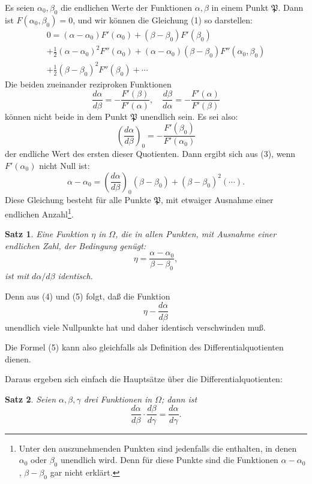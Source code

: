 \documentclass[12pt,a4paper]{article}
\newtheorem*{satz}{Satz}
\begin{document}
Es seien $\alpha_0, \beta_0$ die endlichen Werte der Funktionen $\alpha, \beta$ in einem Punkt $\mathfrak{P}$. Dann ist $F(\alpha_0, \beta_0) = 0$, und wir können die Gleichung (1) so darstellen:
\begin{multline}\label{eq:194-3}
0 = (\alpha - \alpha_0) F'(\alpha_0) + (\beta - \beta_0) F'(\beta_0) \\
+ \tfrac{1}{2}(\alpha - \alpha_0)^2 F''(\alpha_0) + (\alpha - \alpha_0)(\beta - \beta_0) F''(\alpha_0, \beta_0) \\
+ \tfrac{1}{2}(\beta - \beta_0)^2 F''(\beta_0) + \cdots
\end{multline}
Die beiden zueinander reziproken Funktionen
\[
\frac{d\alpha}{d\beta} = -\frac{F'(\beta)}{F'(\alpha)}, \quad \frac{d\beta}{d\alpha} = -\frac{F'(\alpha)}{F'(\beta)}
\]
können nicht beide in dem Punkt $\mathfrak{P}$ unendlich sein. Es sei also:
\[
\left(\frac{d\alpha}{d\beta}\right)_0 = -\frac{F'(\beta_0)}{F'(\alpha_0)}
\]
der endliche Wert des ersten dieser Quotienten. Dann ergibt sich aus (3), wenn $F'(\alpha_0)$ nicht Null ist:
\begin{equation}\label{eq:194-4}
\alpha - \alpha_0 = \left(\frac{d\alpha}{d\beta}\right)_0 (\beta - \beta_0) + (\beta - \beta_0)^2 (\cdots).
\end{equation}
Diese Gleichung besteht für alle Punkte $\mathfrak{P}$, mit etwaiger Ausnahme einer endlichen Anzahl\footnote{Unter den auszunehmenden Punkten sind jedenfalls die enthalten, in denen $\alpha_0$ oder $\beta_0$ unendlich wird. Denn für diese Punkte sind die Funktionen $\alpha - \alpha_0$, $\beta - \beta_0$ gar nicht erklärt.}.

\begin{satz}
Eine Funktion $\eta$ in $\Omega$, die in allen Punkten, mit Ausnahme einer endlichen Zahl, der Bedingung genügt:
\begin{equation}\label{eq:194-5}
\eta = \frac{\alpha - \alpha_0}{\beta - \beta_0},
\end{equation}
ist mit $d\alpha/d\beta$ identisch.
\end{satz}

Denn aus (4) und (5) folgt, daß die Funktion
\[
\eta - \frac{d\alpha}{d\beta}
\]
unendlich viele Nullpunkte hat und daher identisch verschwinden muß.

Die Formel (5) kann also gleichfalls als Definition des Differentialquotienten dienen.

Daraus ergeben sich einfach die Hauptsätze über die Differentialquotienten:

\begin{satz}
Seien $\alpha, \beta, \gamma$ drei Funktionen in $\Omega$; dann ist
\begin{equation}\label{eq:194-6}
\frac{d\alpha}{d\beta} \cdot \frac{d\beta}{d\gamma} = \frac{d\alpha}{d\gamma}.
\end{equation}
\end{satz}
\end{document}
